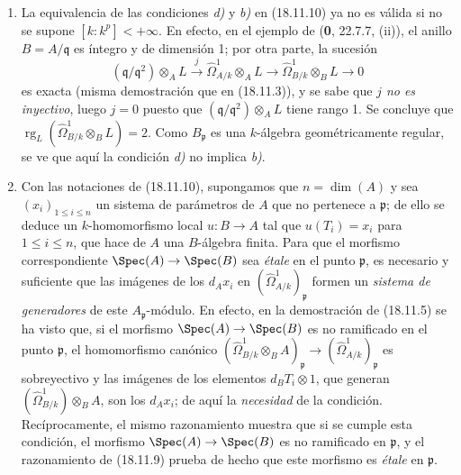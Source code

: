 \begin{remarks}[18.11.11]
\label{IV.18.11.11}
\begin{enumerate}
  \item[(i)] La equivalencia de las condiciones \emph{d)} y \emph{b)} en (18.11.10) ya no es válida si no se supone $[k:k^p]<+\infty$. En efecto, en el ejemplo de (\textbf 0, 22.7.7, (ii)), el anillo $B=A/\mathfrak q$ es íntegro y de dimensión 1; por otra parte, la sucesión
  \[
    (\mathfrak q/\mathfrak q^2)\otimes_A L\xrightarrow{j}\hat{\Omega}^1_{A/k}\otimes_A L\longrightarrow\hat{\Omega}^1_{B/k}\otimes_B L\longrightarrow0
  \]
  es exacta (misma demostración que en (18.11.3)), y se sabe que \emph{$j$ no es inyectivo}, luego $j=0$ puesto que $(\mathfrak q/\mathfrak q^2)\otimes_A L$ tiene rango 1. Se concluye que $\operatorname{rg}_L(\hat{\Omega}^1_{B/k}\otimes_B L)=2$. Como $B_{\mathfrak p}$ es una $k$-álgebra geométricamente regular, se ve que aquí la condición \emph{d)} no implica \emph{b)}.
  \item[(ii)] Con las notaciones de (18.11.10), supongamos que $n=\dim(A)$ y sea $(x_i)_{1\leq i\leq n}$ un sistema de parámetros de $A$ que no pertenece a $\mathfrak p$; de ello se deduce un $k$-homomorfismo local $u:B\to A$ tal que $u(T_i)=x_i$ para $1\leq i\leq n$, que hace de $A$ una $B$-álgebra finita. Para que el morfismo correspondiente $\Spec(A)\to\Spec(B)$ sea \emph{étale} en el punto $\mathfrak p$, es necesario y suficiente que las imágenes de los $d_Ax_i$ en $(\hat{\Omega}^1_{A/k})_{\mathfrak p}$ formen un \emph{sistema de generadores} de este $A_{\mathfrak p}$-módulo. En efecto, en la demostración de (18.11.5) se ha visto que, si el morfismo $\Spec(A)\to\Spec(B)$ es no ramificado en el punto $\mathfrak p$, el homomorfismo canónico $(\hat{\Omega}^1_{B/k}\otimes_B A)_{\mathfrak p}\to(\hat{\Omega}^1_{A/k})_{\mathfrak p}$ es sobreyectivo y las imágenes de los elementos $d_BT_i\otimes1$, que generan $(\hat{\Omega}^1_{B/k})\otimes_B A$, son los $d_Ax_i$; de aquí la \emph{necesidad} de la condición. Recíprocamente, el mismo razonamiento muestra que si se cumple esta condición, el morfismo $\Spec(A)\to\Spec(B)$ es no ramificado en $\mathfrak p$, y el razonamiento de (18.11.9) prueba de hecho que este morfismo es \emph{étale} en $\mathfrak p$.
\end{enumerate}
\end{remarks}

